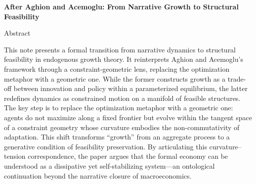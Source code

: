\documentclass[11pt]{article}
\begin{document}
\begin{center}
  {\LARGE\bfseries After Aghion and Acemoglu: From Narrative Growth to
Structural Feasibility \par}
  \vspace{0.5em}{\large Yufei Li}\par
  \vspace{0.3em}{\small Independent Researcher}\par
  \vspace{0.3em}{\small October 2025}\par
\end{center}
\vspace{1em}

Abstract

This note presents a formal transition from narrative dynamics to
structural feasibility in endogenous growth theory. It reinterprets
Aghion and Acemoglu's framework through a constraint-geometric lens,
replacing the optimization metaphor with a geometric one. While the
former constructs growth as a trade-off between innovation and policy
within a parameterized equilibrium, the latter redefines dynamics as
constrained motion on a manifold of feasible structures. The key step is
to replace the optimization metaphor with a geometric one: agents do not
maximize along a fixed frontier but evolve within the tangent space of a
constraint geometry whose curvature embodies the non-commutativity of
adaptation. This shift transforms ``growth'' from an aggregate process
to a generative condition of feasibility preservation. By articulating
this curvature--tension correspondence, the paper argues that the formal
economy can be understood as a dissipative yet self-stabilizing
system---an ontological continuation beyond the narrative closure of
macroeconomics.
\end{document}
